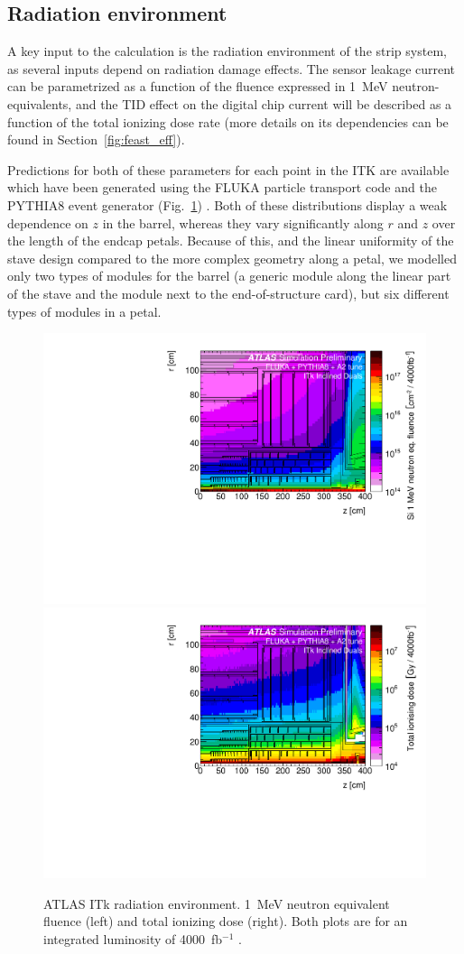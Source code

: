 \subsection{Radiation environment}
A key input to the calculation is the radiation environment of the strip system, as several inputs depend on radiation damage effects. The sensor leakage current can be parametrized as  a function of the fluence expressed in 1~MeV neutron-equivalents, and the TID effect on the digital chip current will be described as a function of the total ionizing dose rate (more details on its dependencies can be found in Section~\ref{fig:feast_eff}). 

Predictions for both of these parameters for each point in the ITK are available which have been generated using the FLUKA particle transport code and the PYTHIA8 event generator (Fig.~\ref{fig:radiation}) \cite{background}. Both of these distributions display a weak dependence on $z$ in the barrel, whereas they vary significantly along $r$ and $z$ over the length of the endcap petals. Because of this, and the linear uniformity of the stave design compared to the more complex geometry along a petal, we modelled only two types of modules for the barrel (a generic module along the linear part of the stave and the module next to the end-of-structure card), but six different types of modules in a petal.

\begin{figure}[ht]
\centering
\includegraphics[width=0.48\linewidth]{figures/fluence.pdf}\quad
\includegraphics[width=0.48\linewidth]{figures/TID.pdf}
\caption{ATLAS ITk radiation environment. 1~MeV neutron equivalent fluence (left) and total ionizing dose (right). Both plots are for an integrated luminosity of 4000~fb$^{-1}$ \cite{background}.}
\label{fig:radiation}
\end{figure}

